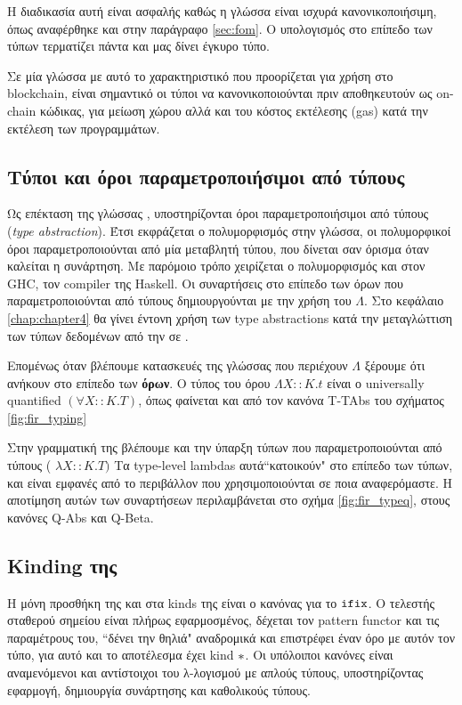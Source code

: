 Η διαδικασία αυτή είναι ασφαλής καθώς η γλώσσα \FOMF{} είναι ισχυρά
κανονικοποιήσιμη, όπως αναφέρθηκε και στην παράγραφο \ref{sec:fom}. Ο
υπολογισμός στο επίπεδο των τύπων τερματίζει πάντα και μας δίνει έγκυρο τύπο.

Σε μία γλώσσα με αυτό το χαρακτηριστικό που προορίζεται για χρήση στο
blockchain, είναι σημαντικό οι τύποι να κανονικοποιούνται πριν αποθηκευτούν ως
on-chain κώδικας, για μείωση χώρου αλλά και του κόστος εκτέλεσης (gas) κατά την
εκτέλεση των προγραμμάτων.


\subsection{Τύποι και όροι παραμετροποιήσιμοι από τύπους}

Ως επέκταση της γλώσσας \FOM, υποστηρίζονται όροι παραμετροποιήσιμοι από τύπους
(\emph{type abstraction}).  Έτσι εκφράζεται ο πολυμορφισμός στην γλώσσα, οι
πολυμορφικοί όροι παραμετροποιούνται από μία μεταβλητή τύπου, που δίνεται σαν
όρισμα όταν καλείται η συνάρτηση. Με παρόμοιο τρόπο χειρίζεται ο πολυμορφισμός
και στον GHC, τον compiler της Haskell. Οι συναρτήσεις στο επίπεδο των όρων που
παραμετροποιούνται από τύπους δημιουργούνται με την χρήση του $\Lambda$. Στο
κεφάλαιο \ref{chap:chapter4} θα γίνει έντονη χρήση των type abstractions κατά
την μεταγλώττιση των τύπων δεδομένων από την \FIR{} σε \FOMF{}.


Επομένως όταν βλέπουμε κατασκευές της γλώσσας που περιέχουν $\Lambda$ ξέρουμε
ότι ανήκουν στο επίπεδο των \textbf{όρων}. Ο τύπος του όρου $ \Lambda X :: K .
t $ είναι ο universally quantified $(\forall X::K.T)$, όπως φαίνεται και από
τον κανόνα T-TAbs του σχήματος \ref{fig:fir_typing}

Στην γραμματική της \FOMF{} βλέπουμε και την ύπαρξη τύπων που
παραμετροποιούνται από τύπους ( $\lambda X :: K. T)$ Τα type-level lambdas
αυτά``κατοικούν" στο επίπεδο των τύπων, και είναι εμφανές από το περιβάλλον που
χρησιμοποιούνται σε ποια αναφερόμαστε. Η αποτίμηση αυτών των συναρτήσεων
περιλαμβάνεται στο σχήμα \ref{fig:fir_typeq}, στους κανόνες Q-Abs και Q-Beta.



\subsection{Kinding της \FOMF{}}

Η μόνη προσθήκη της \FOMF{} και \FIR{} στα kinds της \FOM{} είναι ο κανόνας για
το $\operatorname{\texttt{ifix}}$. Ο τελεστής σταθερού σημείου είναι πλήρως εφαρμοσμένος, δέχεται τον
pattern functor και τις παραμέτρους  του, ``δένει την θηλιά" αναδρομικά και
επιστρέφει έναν όρο με αυτόν τον τύπο, για αυτό και το αποτέλεσμα έχει kind
$\operatorname{\ast}$. Οι υπόλοιποι κανόνες είναι αναμενόμενοι και αντίστοιχοι του λ-λογισμού
με απλούς τύπους, υποστηρίζοντας εφαρμογή, δημιουργία συνάρτησης και καθολικούς
τύπους.

\vspace{1cm}
